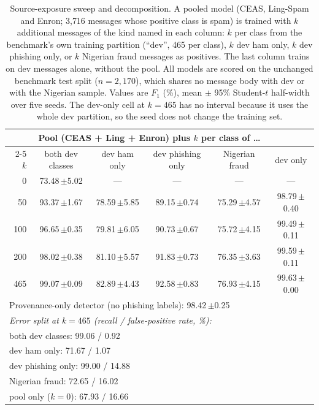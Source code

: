 \begin{table}[t]
\centering\small
\caption{Source-exposure sweep and decomposition. A pooled model (CEAS,
Ling-Spam and Enron; 3{,}716 messages whose positive class is spam) is trained
with $k$ additional messages of the kind named in each column: $k$ per
class from the benchmark's own training partition (``dev'', 465 per class),
$k$ dev ham only, $k$ dev phishing only, or $k$ Nigerian fraud messages as
positives. The last column trains on dev messages alone, without the pool.
All models are scored on the unchanged benchmark test split ($n=2{,}170$),
which shares no message body with dev or with the Nigerian sample. Values are
$F_1$ (\%), mean $\pm$ 95\% Student-$t$ half-width over five seeds. The
dev-only cell at $k=465$ has no interval because it uses the whole dev
partition, so the seed does not change the training set.}
\label{tab:source_exposure}
\begin{tabular}{rccccc}
\toprule
 & \multicolumn{4}{c}{Pool (CEAS + Ling + Enron) plus $k$ per class of \ldots} & \\
\cmidrule(lr){2-5}
$k$ & both dev classes & dev ham only & dev phishing only & Nigerian fraud & dev only \\
\midrule
0 & 73.48\,$\pm$5.02 & --- & --- & --- & --- \\
50 & 93.37\,$\pm$1.67 & 78.59\,$\pm$5.85 & 89.15\,$\pm$0.74 & 75.29\,$\pm$4.57 & 98.79\,$\pm$0.40 \\
100 & 96.65\,$\pm$0.35 & 79.81\,$\pm$6.05 & 90.73\,$\pm$0.67 & 75.72\,$\pm$4.15 & 99.49\,$\pm$0.11 \\
200 & 98.02\,$\pm$0.38 & 81.10\,$\pm$5.57 & 91.83\,$\pm$0.73 & 76.35\,$\pm$3.63 & 99.59\,$\pm$0.11 \\
465 & 99.07\,$\pm$0.09 & 82.89\,$\pm$4.43 & 92.58\,$\pm$0.83 & 76.93\,$\pm$4.15 & 99.63\,$\pm$0.00 \\
\midrule
\multicolumn{6}{l}{Provenance-only detector (no phishing labels): 98.42\,$\pm$0.25} \\
\midrule
\multicolumn{6}{l}{\emph{Error split at $k=465$ (recall / false-positive rate, \%):}} \\
\multicolumn{6}{l}{\quad both dev classes: 99.06 / 0.92} \\
\multicolumn{6}{l}{\quad dev ham only: 71.67 / 1.07} \\
\multicolumn{6}{l}{\quad dev phishing only: 99.00 / 14.88} \\
\multicolumn{6}{l}{\quad Nigerian fraud: 72.65 / 16.02} \\
\multicolumn{6}{l}{\quad pool only ($k=0$): 67.93 / 16.66} \\
\bottomrule
\end{tabular}
\end{table}
